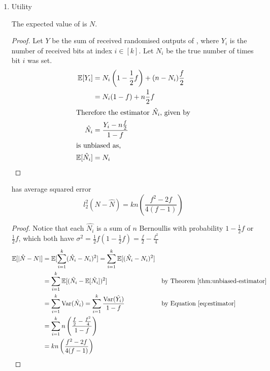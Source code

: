\documentclass{article}
\begin{document}
\begin{enumerate}
\begin{proof}
\begin{align*}
		D &\leq \left(1-\frac{1}{2}f\right)^{2m}\times\left(\frac{1}{2}f\right)^{-2m}\\
			&= \left(\frac{2-f}{f}\right)^{2m}
	\end{align*}
	Therefore,
	\begin{equation}
		\varepsilon = 2m\log\left(\frac{2-f}{f}\right)
	\end{equation}
\end{proof}
\item Utility
\begin{theorem}
\label{thm:unbiased-estimator}
	The expected value of  is $N$.
\end{theorem}
\begin{proof} Let $Y$ be the sum of received randomised outputs of , where $Y_i$ is the number of received bits at index $i\in [k]$. Let $N_i$ be the true number of times bit $i$ was set.
\begin{align}
\mathbb{E}[Y_i] &= N_i\left(1-\frac{1}{2}f\right) + (n-N_i)\frac{f}{2}\nonumber\\
	&= N_i(1-f) + n\frac{1}{2}f\nonumber\\
	\intertext{Therefore the estimator $\hat{N_i}$, given by}
\hat{N_i} &= \frac{Y_i-n\frac{f}{2}}{1-f}\label{eq:estimator}\\
\intertext{is unbiased as,}
\mathbb{E}[\hat{N_i}] &= N_i
\end{align}
\end{proof}
\begin{theorem}
	 has average squared error
	\begin{equation*}
		l_2^2(N-\hat{N}) = kn\left(\frac{f^2-2f}{4(f-1)}\right)
	\end{equation*}
\end{theorem}
\begin{proof}\hfill
Notice that each $\hat{N_i}$ is a sum of $n$ Bernoullis with probability $1-\frac{1}{2}f$ or $\frac{1}{2}f$, which both have $\sigma^2 = \frac{1}{2}f\left(1-\frac{1}{2}f\right) = \frac{f}{2}-\frac{f^2}{4}$
	\begin{align*}
		\mathbb{E}[|\hat{N}-N|] &= \mathbb{E}[\sum\limits_{i=1}^k(\hat{N_i}-N_i)^2] = \sum\limits_{i=1}^k\mathbb{E}[(\hat{N_i}-N_i)^2] &&\\
			&= \sum\limits_{i=1}^k\mathbb{E}[(\hat{N_i}-\mathbb{E}[\hat{N_i}])^2] && \text{by Theorem~\ref{thm:unbiased-estimator}}\\
			&= \sum\limits_{i=1}^k\text{Var}(\hat{N_i}) = \sum\limits_{i=1}^k\frac{\text{Var}(\hat{Y_i})}{1-f}&&\text{by Equation~\ref{eq:estimator}}\\
			&= \sum\limits_{i=1}^kn\left(\frac{\frac{f}{2}-\frac{f^2}{4}}{1-f}\right) &&\\
			&= kn\left(\frac{f^2-2f}{4(f-1)}\right)
	\end{align*}
	
\end{proof}
\end{enumerate}


\end{document}
